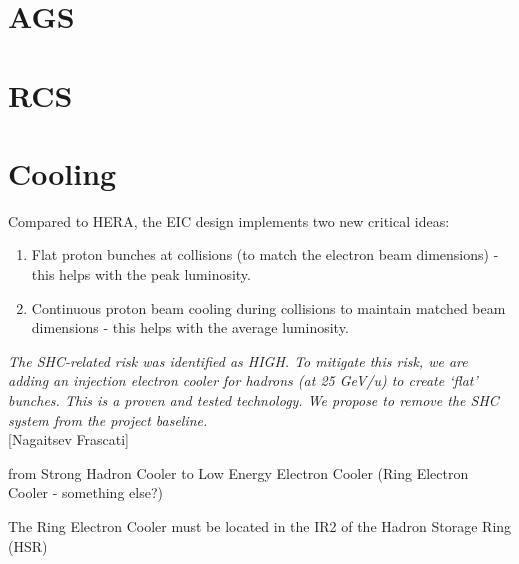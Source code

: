 \section{AGS}

\section{RCS}

\section{Cooling}
Compared to HERA, the EIC design implements two new critical ideas:
\begin{enumerate}
    \item Flat proton bunches at collisions (to match the electron beam dimensions) - this helps with the
peak luminosity.
    \item Continuous proton beam cooling during collisions to maintain matched beam dimensions - this
helps with the average luminosity.
\end{enumerate}
\emph{The SHC-related risk was identified as HIGH.
To mitigate this risk, we are adding an injection electron cooler for hadrons (at 25 GeV/u) to create ‘flat’ bunches. This is a proven and tested technology. We propose to remove the SHC system from the project baseline.\\}
[Nagaitsev Frascati]

from Strong Hadron Cooler to Low Energy Electron Cooler (Ring Electron Cooler - something else?)

The Ring Electron Cooler must be located in the IR2 of the Hadron Storage Ring (HSR)








